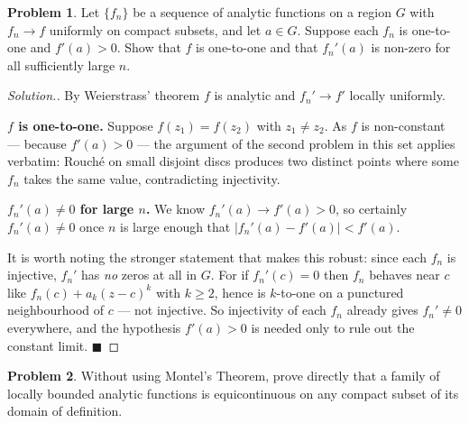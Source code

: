 \documentclass[11pt,a4paper]{article}
\theoremstyle{definition}
\newtheorem{problemx}{Problem}[section]
\newenvironment{problem}{\begin{problemx}}{\end{problemx}}
\newenvironment{solution}
  {\renewcommand{\qedsymbol}{}\begin{proof}[\textit{Solution}.]}
  {\end{proof}}
\begin{document}
\begin{problem}
Let $\{f_n\}$ be a sequence of analytic functions on a region $G$ with
$f_n \rightarrow f$ uniformly on compact subsets, and let $a \in G$. Suppose each
$f_n$ is one-to-one and $f'(a) > 0$. Show that $f$ is one-to-one and that
$f_n'(a)$ is non-zero for all sufficiently large $n$.
\end{problem}

\begin{solution}
By Weierstrass' theorem $f$ is analytic and $f_n' \rightarrow f'$ locally
uniformly.

\textbf{$f$ is one-to-one.} Suppose $f(z_1) = f(z_2)$ with $z_1 \neq z_2$. As $f$
is non-constant --- because $f'(a) > 0$ --- the argument of the second problem in
this set applies verbatim: Rouch\'e on small disjoint discs produces two distinct
points where some $f_n$ takes the same value, contradicting injectivity.

\textbf{$f_n'(a) \neq 0$ for large $n$.} We know $f_n'(a) \rightarrow f'(a) > 0$,
so certainly $f_n'(a) \neq 0$ once $n$ is large enough that
$\left|f_n'(a) - f'(a)\right| < f'(a)$.

It is worth noting the stronger statement that makes this robust: since each $f_n$
is injective, $f_n'$ has \emph{no} zeros at all in $G$. For if $f_n'(c) = 0$ then
$f_n$ behaves near $c$ like $f_n(c) + a_k(z-c)^{k}$ with $k \geq 2$, hence is
$k$-to-one on a punctured neighbourhood of $c$ --- not injective. So injectivity of
each $f_n$ already gives $f_n' \neq 0$ everywhere, and the hypothesis
$f'(a) > 0$ is needed only to rule out the constant limit. $\blacksquare$
\end{solution}


\begin{problem}
Without using Montel's Theorem, prove directly that a family of locally bounded
analytic functions is equicontinuous on any compact subset of its domain of
definition.
\end{problem}
\end{document}
